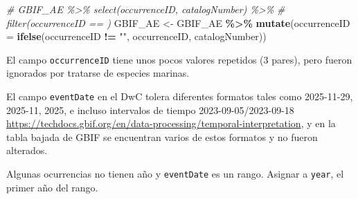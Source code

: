 \documentclass[sn-apa,pdflatex]{sn-jnl}
\newenvironment{Shaded}{\begin{snugshade}}{\end{snugshade}}
\newcommand{\AttributeTok}[1]{\textcolor[rgb]{0.13,0.29,0.53}{#1}}
\newcommand{\CommentTok}[1]{\textcolor[rgb]{0.56,0.35,0.01}{\textit{#1}}}
\newcommand{\ConstantTok}[1]{\textcolor[rgb]{0.56,0.35,0.01}{#1}}
\newcommand{\DecValTok}[1]{\textcolor[rgb]{0.00,0.00,0.81}{#1}}
\newcommand{\FunctionTok}[1]{\textcolor[rgb]{0.13,0.29,0.53}{\textbf{#1}}}
\newcommand{\NormalTok}[1]{#1}
\newcommand{\OtherTok}[1]{\textcolor[rgb]{0.56,0.35,0.01}{#1}}
\newcommand{\SpecialCharTok}[1]{\textcolor[rgb]{0.81,0.36,0.00}{\textbf{#1}}}
\newcommand{\StringTok}[1]{\textcolor[rgb]{0.31,0.60,0.02}{#1}}
\begin{document}
\begin{Shaded}
\begin{Highlighting}[]
\CommentTok{\# GBIF\_AE \%\textgreater{}\% select(occurrenceID, catalogNumber) \%\textgreater{}\%}
\CommentTok{\# filter(occurrenceID == \textquotesingle{}\textquotesingle{})}
\NormalTok{GBIF\_AE }\OtherTok{\textless{}{-}}\NormalTok{ GBIF\_AE }\SpecialCharTok{\%\textgreater{}\%}
    \FunctionTok{mutate}\NormalTok{(}\AttributeTok{occurrenceID =} \FunctionTok{ifelse}\NormalTok{(occurrenceID }\SpecialCharTok{!=} \StringTok{""}\NormalTok{, occurrenceID,}
\NormalTok{        catalogNumber))}
\end{Highlighting}
\end{Shaded}

El campo \texttt{occurrenceID} tiene unos pocos valores repetidos (3
pares), pero fueron ignorados por tratarse de especies marinas.

El campo \texttt{eventDate} en el DwC tolera diferentes formatos tales
como 2025-11-29, 2025-11, 2025, e incluso intervalos de tiempo
2023-09-05/2023-09-18
\url{https://techdocs.gbif.org/en/data-processing/temporal-interpretation},
y en la tabla bajada de GBIF se encuentran varios de estos formatos y no
fueron alterados.

Algunas ocurrencias no tienen año y \texttt{eventDate} es un rango.
Asignar a \texttt{year}, el primer año del rango.

\begin{Shaded}
\end{Shaded}
\end{document}

